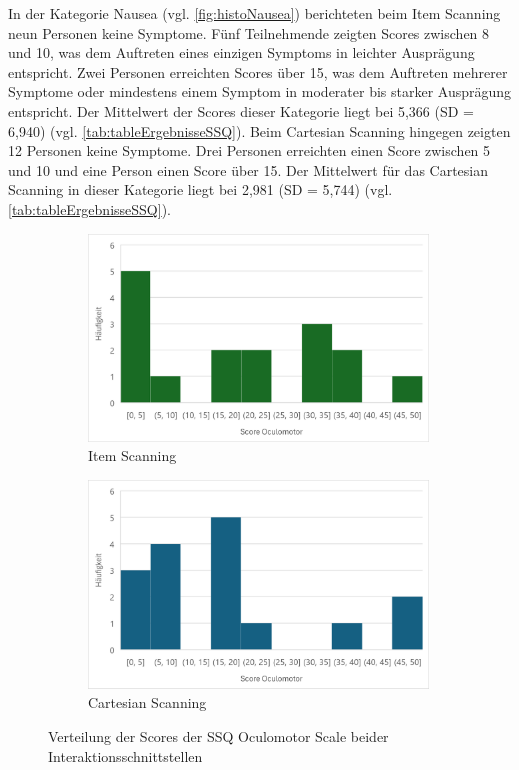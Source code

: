 In der Kategorie Nausea (vgl. \autoref{fig:histoNausea}) berichteten beim Item Scanning neun Personen keine Symptome. Fünf Teilnehmende zeigten Scores zwischen 8 und 10, was dem Auftreten eines einzigen Symptoms in leichter Ausprägung entspricht. Zwei Personen erreichten Scores über 15, was dem Auftreten mehrerer Symptome oder mindestens einem Symptom in moderater bis starker Ausprägung entspricht. Der Mittelwert der Scores dieser Kategorie liegt bei 5,366 (SD = 6,940) (vgl. \autoref{tab:tableErgebnisseSSQ}). Beim Cartesian Scanning hingegen zeigten 12 Personen keine Symptome. Drei Personen erreichten einen Score zwischen 5 und 10 und eine Person einen Score über 15. Der Mittelwert für das Cartesian Scanning in dieser Kategorie liegt bei 2,981 (SD = 5,744) (vgl. \autoref{tab:tableErgebnisseSSQ}).

\begin{figure}
    \centering
    \begin{subfigure}{.5\textwidth}
        \centering
        \includegraphics[width=0.99\textwidth]{images/Results/Histogramm-Oculomotor-Scale-Item.png}
        \caption{Item Scanning}
        \label{fig:histoOculomotorItem}   
    \end{subfigure}%
    \begin{subfigure}{.5\textwidth}
        \centering
        \includegraphics[width=0.99\textwidth]{images/Results/Histogramm-Oculomotor-Scale-Cartesian.png}
         \caption{Cartesian Scanning}
         \label{fig:histoOculomotorCartesian}
    \end{subfigure}
    \caption{Verteilung der Scores der SSQ Oculomotor Scale beider Interaktionsschnittstellen}
    \label{fig:histoOculomotor}
\end{figure}

